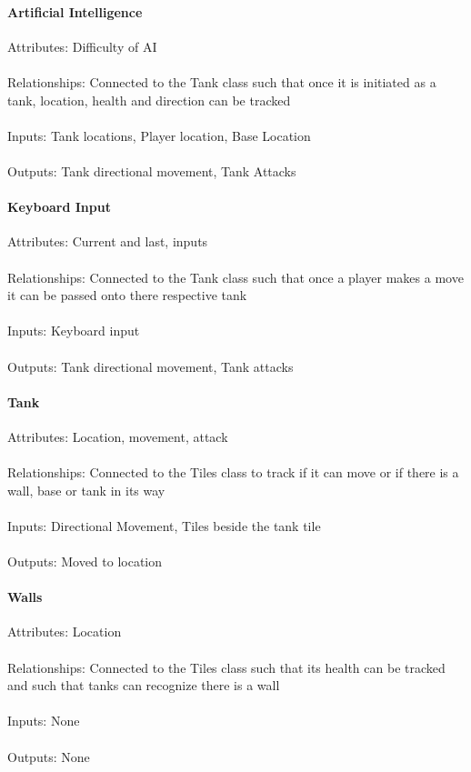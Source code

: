 \documentclass[12pt, titlepage]{article}
\begin{document}
\paragraph{Artificial Intelligence}
Attributes: Difficulty of AI
\\\\Relationships:  Connected to the Tank class such that once it is initiated 
as a tank, location, health and direction can be tracked
\\\\Inputs: Tank locations, Player location, Base Location
\\\\Outputs: Tank directional movement, Tank Attacks
\paragraph{Keyboard Input}
Attributes: Current and last, inputs
\\\\Relationships: Connected to the Tank class such that once a player makes a 
move it can be passed onto there respective tank
\\\\Inputs: Keyboard input
\\\\Outputs: Tank directional movement, Tank attacks
\paragraph{Tank}
Attributes: Location, movement, attack
\\\\Relationships: Connected to the Tiles class to track if it can move or if 
there is a wall, base or tank in its way
\\\\Inputs: Directional Movement, Tiles beside the tank tile
\\\\Outputs: Moved to location
\paragraph{Walls}
Attributes: Location
\\\\Relationships: Connected to the Tiles class such that its health can be 
tracked and such that tanks can recognize there is a wall
\\\\Inputs: None
\\\\Outputs: None
\end{document}
